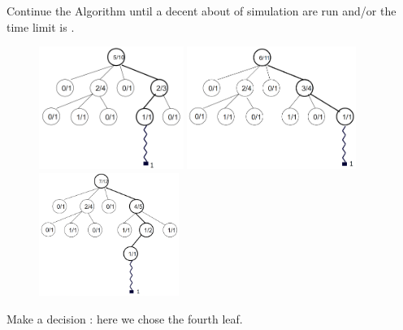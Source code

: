 Continue the Algorithm until a decent about of simulation are run and/or the time limit is .
\begin{figure}[H]
\centering
	\begin{minipage}[b]{0.33\linewidth}
	\centering
		\includegraphics[height=4cm]{1_Presentation/1.2_Algorithm_MCTS_Benoit/img/10.png}
	\end{minipage}%
	\begin{minipage}[b]{0.33\linewidth}
	\centering
		\includegraphics[height=4cm]{1_Presentation/1.2_Algorithm_MCTS_Benoit/img/11.png}
	\end{minipage}%
	\begin{minipage}[b]{0.33\linewidth}
	\centering
		\includegraphics[height=4cm]{1_Presentation/1.2_Algorithm_MCTS_Benoit/img/12.png}
	\end{minipage}%
\end{figure}

Make a decision : here we chose the fourth leaf.\\
\newpage
